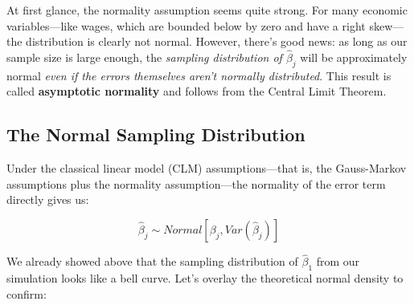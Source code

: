 \documentclass[
  letterpaper,
  DIV=11,
  numbers=noendperiod]{scrreprt}
\begin{document}
At first glance, the normality assumption seems quite strong. For many
economic variables---like wages, which are bounded below by zero and
have a right skew---the distribution is clearly not normal. However,
there's good news: as long as our sample size is large enough, the
\emph{sampling distribution of \(\hat{\beta}_j\)} will be approximately
normal \emph{even if the errors themselves aren't normally distributed}.
This result is called \textbf{asymptotic normality} and follows from the
Central Limit Theorem.

\subsection{The Normal Sampling
Distribution}\label{the-normal-sampling-distribution}

Under the classical linear model (CLM) assumptions---that is, the
Gauss-Markov assumptions plus the normality assumption---the normality
of the error term directly gives us:

\[\hat{\beta}_j \sim Normal\left[\beta_j, Var(\hat{\beta}_j)\right]\]

We already showed above that the sampling distribution of
\(\hat{\beta}_1\) from our simulation looks like a bell curve. Let's
overlay the theoretical normal density to confirm:
\end{document}
